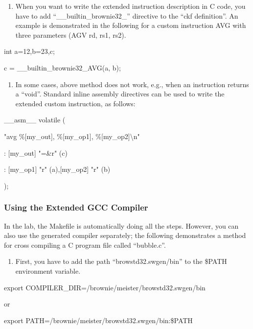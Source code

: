 \documentclass[
]{article}
\begin{document}
\begin{enumerate}
\def\labelenumi{\arabic{enumi}.}
\item
  When you want to write the extended instruction description in C code,
  you have to add ``\_\_builtin\_brownie32\_'' directive to the ``ckf
  definition''. An example is demonstrated in the following for a custom
  instruction AVG with three parameters (AGV rd, rs1, rs2).
\end{enumerate}

int a=12,b=23,c;

c = \_\_builtin\_brownie32\_AVG(a, b);

\begin{enumerate}
\def\labelenumi{\arabic{enumi}.}
\setcounter{enumi}{1}
\item
  In some cases, above method does not work, e.g., when an instruction
  returns a ``void''. Standard inline assembly directives can be used to
  write the extended custom instruction, as follows:
\end{enumerate}

\_\_asm\_\_ volatile (

"avg \%{[}my\_out{]}, \%{[}my\_op1{]}, \%{[}my\_op2{]}\textbackslash n"

: {[}my\_out{]} "=\&r" (c)

: {[}my\_op1{]} "r" (a),{[}my\_op2{]} "r" (b)

);

\hypertarget{using-the-extended-gcc-compiler}{%
\subsubsection{Using the Extended GCC
Compiler}\label{using-the-extended-gcc-compiler}}

In the lab, the Makefile is automatically doing all the steps. However,
you can also use the generated compiler separately; the following
demonstrates a method for cross compiling a C program file called
``bubble.c''.

\begin{enumerate}
\def\labelenumi{\arabic{enumi}.}
\item
  First, you have to add the path ``browstd32.swgen/bin'' to the \$PATH
  environment variable.
\end{enumerate}

export COMPILER\_DIR=/brownie/meister/browstd32.swgen/bin

or

export PATH=/brownie/meister/browstd32.swgen/bin:\$PATH
\end{document}
